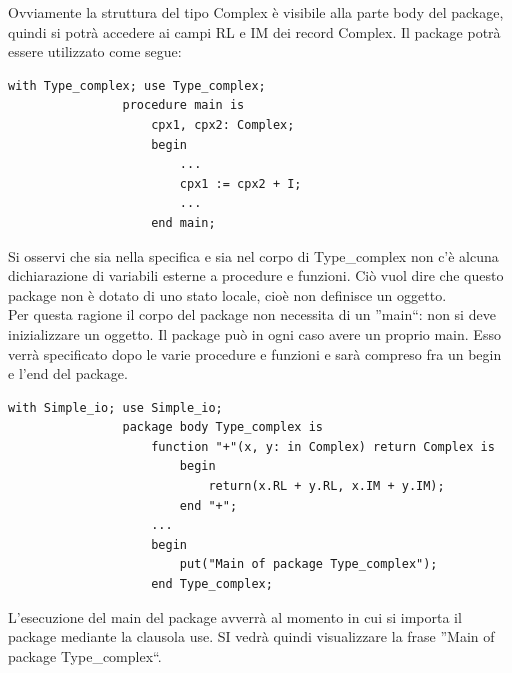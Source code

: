 \documentclass[12pt]{report}
\begin{document}
			Ovviamente la struttura del tipo Complex è visibile alla parte body del package, quindi si potrà accedere ai campi RL e IM dei record Complex. Il package potrà essere utilizzato come segue:
			\begin{lstlisting}[style=adastyle]
				with Type_complex; use Type_complex;
				procedure main is
					cpx1, cpx2: Complex;
					begin
						...
						cpx1 := cpx2 + I;
						...
					end main;\end{lstlisting}
			Si osservi che sia nella specifica e sia nel corpo di Type\_complex	non c'è alcuna dichiarazione di variabili esterne a procedure e funzioni. Ciò vuol dire che questo package non è dotato di uno stato locale, cioè non definisce un oggetto. \\
			Per questa ragione il corpo del package non necessita di un ''main``: non si deve inizializzare un oggetto. Il package può in ogni caso avere un proprio main. Esso verrà specificato dopo le varie procedure e funzioni e sarà compreso fra un begin e l'end del package.
			\begin{lstlisting}[style=adastyle]
				with Simple_io; use Simple_io;
				package body Type_complex is
					function "+"(x, y: in Complex) return Complex is
						begin
							return(x.RL + y.RL, x.IM + y.IM);
						end "+";
					...
					begin
						put("Main of package Type_complex");
					end Type_complex;\end{lstlisting}
			L'esecuzione del main del package avverrà al momento in cui si importa il package mediante la clausola use. SI vedrà quindi visualizzare la frase ''Main of package Type\_complex``.
\end{document}

